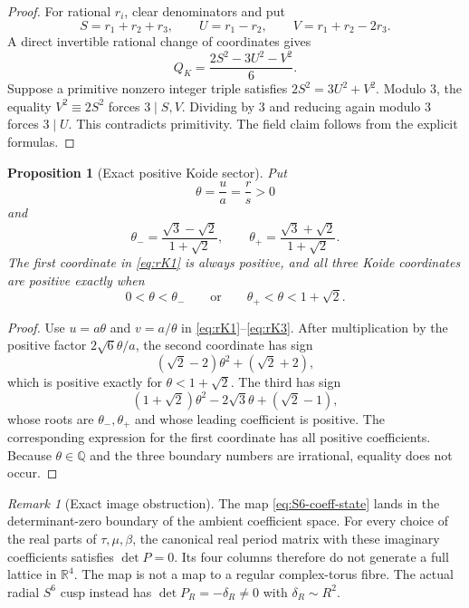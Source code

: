 \documentclass[11pt]{article}
\newtheorem{proposition}[theorem]{Proposition}
\theoremstyle{definition}
\theoremstyle{remark}
\newtheorem{remark}[theorem]{Remark}
\newcommand{\Q}{\mathbb Q}
\newcommand{\R}{\mathbb R}
\begin{document}
\begin{proof}
For rational $r_i$, clear denominators and put
\[
 S=r_1+r_2+r_3,
 \qquad U=r_1-r_2,
 \qquad V=r_1+r_2-2r_3.
\]
A direct invertible rational change of coordinates gives
\begin{equation}\label{eq:rational-Q}
 Q_K=\frac{2S^2-3U^2-V^2}{6}.
\end{equation}
Suppose a primitive nonzero integer triple satisfies
$2S^2=3U^2+V^2$.  Modulo $3$, the equality
$V^2\equiv2S^2$ forces $3\mid S,V$.  Dividing by $3$ and reducing again
modulo $3$ forces $3\mid U$.  This contradicts primitivity.  The field
claim follows from the explicit formulas.
\end{proof}

\begin{proposition}[Exact positive Koide sector]\label{prop:positive-sector}
Put
\begin{equation}\label{eq:theta}
 \theta=\frac ua=\frac rs>0
\end{equation}
and
\begin{equation}\label{eq:thresholds}
 \theta_-=
 \frac{\sqrt3-\sqrt2}{1+\sqrt2},
 \qquad
 \theta_+=\frac{\sqrt3+\sqrt2}{1+\sqrt2}.
\end{equation}
The first coordinate in \eqref{eq:rK1} is always positive, and all three
Koide coordinates are positive exactly when
\begin{equation}\label{eq:positive-sector-condition}
 0<\theta<\theta_-
 \qquad\text{or}\qquad
 \theta_+<\theta<1+\sqrt2.
\end{equation}
\end{proposition}

\begin{proof}
Use $u=a\theta$ and $v=a/\theta$ in
\eqref{eq:rK1}--\eqref{eq:rK3}.  After multiplication by the positive factor
$2\sqrt6\theta/a$, the second coordinate has sign
\[
 (\sqrt2-2)\theta^2+(\sqrt2+2),
\]
which is positive exactly for $\theta<1+\sqrt2$.  The third has sign
\[
 (1+\sqrt2)\theta^2-2\sqrt3\theta+(\sqrt2-1),
\]
whose roots are $\theta_-,\theta_+$ and whose leading coefficient is
positive.  The corresponding expression for the first coordinate has all
positive coefficients.  Because $\theta\in\Q$ and the three boundary numbers
are irrational, equality does not occur.
\end{proof}

\begin{remark}[Exact image obstruction]
The map \eqref{eq:S6-coeff-state} lands in the determinant-zero boundary of
the ambient coefficient space.  For every choice of the real parts of
$\tau,\mu,\beta$, the canonical real period matrix with these imaginary
coefficients satisfies $\det P=0$.  Its four columns therefore do not generate
a full lattice in $\R^4$.  The map is not a map to a regular complex-torus
fibre.  The actual radial $S^6$ cusp instead has
$\det P_R=-\delta_R\ne0$ with $\delta_R\sim R^2$.
\end{remark}
\end{document}
